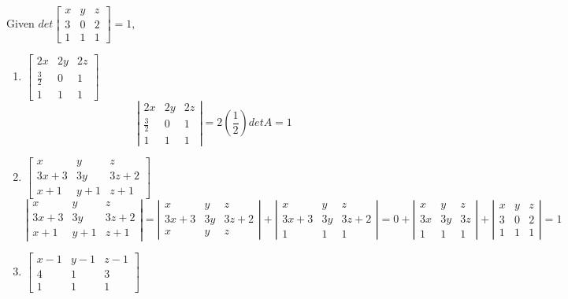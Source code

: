 \documentclass[twoside]{amsart}
\theoremstyle{plain}
\theoremstyle{definition}
\newcommand{\exercisehead}[1]
  {
   \noindent{\small\bf Exercise #1.}
   \smallskip}
\begin{document}
\exercisehead{2} Given $det{ \left[ \begin{matrix} x & y & z \\ 3 & 0 & 2 \\ 1 & 1 & 1 \end{matrix} \right]} = 1$,  
\begin{enumerate}
\item $\left[ \begin{matrix} 2x & 2y & 2z \\ \frac{3}{2} & 0 & 1 \\ 1 & 1 & 1 \end{matrix} \right]$ 
\[
\left| \begin{matrix} 2x & 2y & 2z \\ \frac{3}{2} & 0 & 1 \\ 1 & 1 & 1 \end{matrix} \right| = 2\left( \frac{1}{2} \right) det{A} = 1 
\]
\item $\left[ \begin{matrix} x & y & z \\ 3x+3 & 3y & 3z + 2 \\ x + 1 & y + 1 & z + 1 \end{matrix} \right]$ 
\[
\left| \begin{matrix} x & y & z \\ 3x + 3 & 3y & 3z + 2 \\ x + 1 & y + 1 & z + 1 \end{matrix} \right| = \left| \begin{matrix} x & y & z \\ 3x + 3 & 3y & 3z + 2  \\ x & y & z \end{matrix} \right| + \left| \begin{matrix} x & y & z \\ 3x+ 3 & 3y & 3z + 2 \\ 1 & 1 & 1 \end{matrix} \right| = 0 + \left| \begin{matrix} x & y & z \\ 3x & 3y & 3z \\ 1 & 1 & 1 \end{matrix} \right| + \left| \begin{matrix} x & y & z \\ 3 & 0 & 2 \\ 1 & 1 & 1 \end{matrix} \right| = \boxed{ 1 } 
\]
\item $\left[ \begin{matrix} x - 1 & y -1 & z -1 \\ 4 & 1 & 3 \\ 1 & 1 & 1 \end{matrix} \right]$ 

\end{enumerate}
\end{document}
